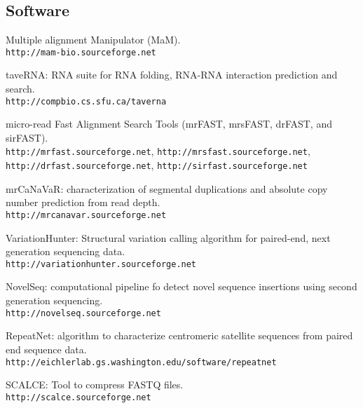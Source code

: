 \subsection{\small \sc Software}
\begin{list2}
\item
  Multiple alignment Manipulator (MaM).\\
  {\tt http://mam-bio.sourceforge.net}
\item
  taveRNA: RNA suite for RNA folding, RNA-RNA interaction prediction and search.\\
  {\tt http://compbio.cs.sfu.ca/taverna}

\item
  micro-read Fast Alignment Search Tools (mrFAST, mrsFAST, drFAST, and sirFAST).\\
  {\tt http://mrfast.sourceforge.net},
  {\tt http://mrsfast.sourceforge.net},
  {\tt http://drfast.sourceforge.net},  {\tt http://sirfast.sourceforge.net}
\item
  mrCaNaVaR: characterization of segmental duplications and absolute copy number prediction from read depth.\\
  {\tt http://mrcanavar.sourceforge.net}
\item
  VariationHunter: Structural variation calling algorithm for paired-end, next
  generation sequencing data.\\
  {\tt http://variationhunter.sourceforge.net}
\item
  NovelSeq: computational pipeline fo detect novel sequence insertions using second generation sequencing.\\
  {\tt http://novelseq.sourceforge.net}
\item
  RepeatNet: algorithm to characterize centromeric satellite sequences from paired end sequence data.\\
  {\tt http://eichlerlab.gs.washington.edu/software/repeatnet}
\item
  SCALCE: Tool to compress FASTQ files. \\
  {\tt http://scalce.sourceforge.net}
\end{list2}







